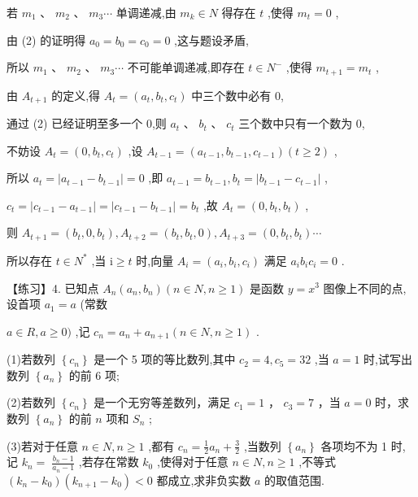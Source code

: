 \documentclass[10pt]{article}
\begin{document}
若 \({m}_{1}\text{ 、 }{m}_{2}\text{ 、 }{m}_{3}\cdots\) 单调递减,由 \({m}_{k} \in  N\) 得存在 \(t\) ,使得 \({m}_{t} = 0\) ,

由 (2) 的证明得 \({a}_{0} = {b}_{0} = {c}_{0} = 0\) ,这与题设矛盾,

所以 \({m}_{1}\text{ 、 }{m}_{2}\text{ 、 }{m}_{3}\cdots\) 不可能单调递减,即存在 \(t \in  {N}^{ - }\) ,使得 \({m}_{t + 1} = {m}_{t}\) ,

由 \({A}_{t + 1}\) 的定义,得 \({A}_{t} = \left( {{a}_{t},{b}_{t},{c}_{t}}\right)\) 中三个数中必有 0,

通过 (2) 已经证明至多一个 0,则 \({a}_{t}\text{ 、 }{b}_{t}\text{ 、 }{c}_{t}\) 三个数中只有一个数为 0,

不妨设 \({A}_{t} = \left( {0,{b}_{t},{c}_{t}}\right)\) ,设 \({A}_{t - 1} = \left( {{a}_{t - 1},{b}_{t - 1},{c}_{t - 1}}\right) \left( {t \geq  2}\right)\) ,

所以 \({a}_{t} = \left| {{a}_{t - 1} - {b}_{t - 1}}\right|  = 0\) ,即 \({a}_{t - 1} = {b}_{t - 1},{b}_{t} = \left| {{b}_{t - 1} - {c}_{t - 1}}\right|\) ,

\({c}_{t} = \left| {{c}_{t - 1} - {a}_{t - 1}}\right|  = \left| {{c}_{t - 1} - {b}_{t - 1}}\right|  = {b}_{t}\) ,故 \({A}_{t} = \left( {0,{b}_{t},{b}_{t}}\right)\) ,

则 \({A}_{t + 1} = \left( {{b}_{t},0,{b}_{t}}\right) ,{A}_{t + 2} = \left( {{b}_{t},{b}_{t},0}\right) ,{A}_{t + 3} = \left( {0,{b}_{t},{b}_{t}}\right) \cdots\)

所以存在 \(t \in  {N}^{ * }\) ,当 \(\mathrm{i} \geq  t\) 时,向量 \({A}_{i} = \left( {{a}_{i},{b}_{i},{c}_{i}}\right)\) 满足 \({a}_{i}{b}_{i}{c}_{i} = 0\) .

【练习】4. 已知点 \({A}_{n}\left( {{a}_{n},{b}_{n}}\right) \left( {n \in  N,n \geq  1}\right)\) 是函数 \(y = {x}^{3}\) 图像上不同的点,设首项 \({a}_{1} = a\) (常数

\(a \in  R,a \geq  0)\) ,记 \({c}_{n} = {a}_{n} + {a}_{n + 1}\left( {n \in  N,n \geq  1}\right)\) .

(1)若数列 \(\left\{  {c}_{n}\right\}\) 是一个 5 项的等比数列,其中 \({c}_{2} = 4,{c}_{5} = {32}\) ,当 \(a = 1\) 时,试写出数列 \(\left\{  {a}_{n}\right\}\) 的前 6 项;

(2)若数列 \(\left\{  {c}_{n}\right\}\) 是一个无穷等差数列，满足 \({c}_{1} = 1\) ， \({c}_{3} = 7\) ，当 \(a = 0\) 时，求数列 \(\left\{  {a}_{n}\right\}\) 的前 \(n\) 项和 \({S}_{n}\) ;

(3)若对于任意 \(n \in  N,n \geq  1\) ,都有 \({c}_{n} = \frac{1}{2}{a}_{n} + \frac{3}{2}\) ,当数列 \(\left\{  {a}_{n}\right\}\) 各项均不为 1 时,记 \({k}_{n} = \; \frac{{b}_{n} - 1}{{a}_{n} - 1}\) ,若存在常数 \({k}_{0}\) ,使得对于任意 \(n \in  N,n \geq  1\) ,不等式 \(\left( {{k}_{n} - {k}_{0}}\right) \left( {{k}_{n + 1} - {k}_{0}}\right)  < 0\) 都成立,求非负实数 \(a\) 的取值范围.
\end{document}
